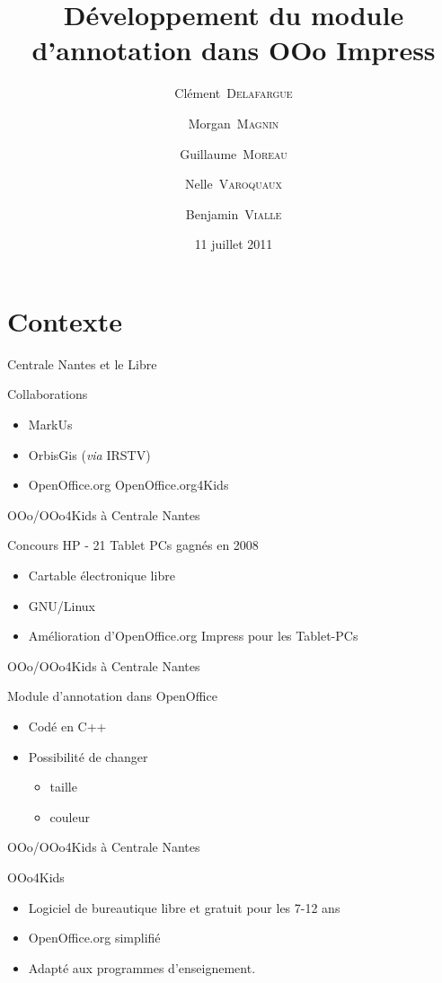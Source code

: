 \documentclass[handout]{beamer}
\title{Développement du module d'annotation dans OOo Impress}
\author{Clément~\textsc{Delafargue} \and Morgan~\textsc{Magnin} \and Guillaume~\textsc{Moreau} \and Nelle~\textsc{Varoquaux}\and Benjamin~\textsc{Vialle}}
\institute[\textsc{ECN}]{École Centrale de Nantes}
\date{11 juillet 2011}
\begin{document}
\frame{\titlepage}

\section{Contexte}

\begin{frame}{Centrale Nantes et le Libre}
    \begin{block}{Collaborations}
	\begin{itemize}[<+->]
	    \item MarkUs
	    \item OrbisGis (\textit{via} IRSTV)
	    \item OpenOffice.org OpenOffice.org4Kids
	\end{itemize}
    \end{block}
\end{frame}

\begin{frame}{OOo/OOo4Kids à Centrale Nantes}
    \begin{block}{Concours HP - 21 Tablet PCs gagnés en 2008}
	\begin{itemize}[<+->]
	    \item Cartable électronique libre
            \item GNU/Linux
            \item Amélioration d'OpenOffice.org Impress pour les Tablet-PCs
	\end{itemize}
    \end{block}
\end{frame}

\begin{frame}{OOo/OOo4Kids à Centrale Nantes}
    \begin{block}{Module d'annotation dans OpenOffice}
	\begin{itemize}
	    \item Codé en C++
	    \item Possibilité de changer
	    \begin{itemize}
		\item taille
		\item couleur
	    \end{itemize}
	\end{itemize}
    \end{block}
\end{frame}

\begin{frame}{OOo/OOo4Kids à Centrale Nantes}
    \begin{block}{OOo4Kids}
	\begin{itemize}[<+->]
	    \item Logiciel de bureautique libre et gratuit pour les 7-12 ans
	    \item OpenOffice.org simplifié
	    \item Adapté aux programmes d'enseignement.
	\end{itemize}
    \end{block}
\end{frame}
\end{document}

